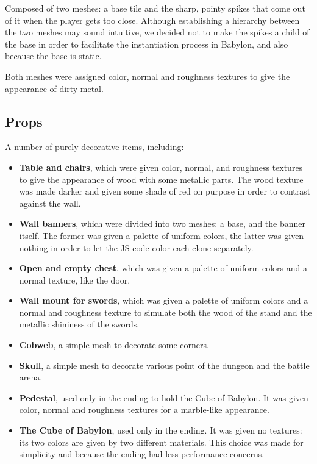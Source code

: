 Composed of two meshes: a base tile and the sharp, pointy spikes that come out of it when the player gets too close. Although establishing a hierarchy between the two meshes may sound intuitive, we decided not to make the spikes a child of the base in order to facilitate the instantiation process in Babylon, and also because the base is static.

Both meshes were assigned color, normal and roughness textures to give the appearance of dirty metal.

\subsection{Props}

A number of purely decorative items, including:

\begin{itemize}
    \item \textbf{Table and chairs}, which were given color, normal, and roughness textures to give the appearance of wood with some metallic parts. The wood texture was made darker and given some shade of red on purpose in order to contrast against the wall.
    \item \textbf{Wall banners}, which were divided into two meshes: a base, and the banner itself. The former was given a palette of uniform colors, the latter was given nothing in order to let the JS code color each clone separately.
    \item \textbf{Open and empty chest}, which was given a palette of uniform colors and a normal texture, like the door.
    \item \textbf{Wall mount for swords}, which was given a palette of uniform colors and a normal and roughness texture to simulate both the wood of the stand and the metallic shininess of the swords.
    \item \textbf{Cobweb}, a simple mesh to decorate some corners.
    \item \textbf{Skull}, a simple mesh to decorate various point of the dungeon and the battle arena.
    \item \textbf{Pedestal}, used only in the ending to hold the Cube of Babylon. It was given color, normal and roughness textures for a marble-like appearance.
    \item \textbf{The Cube of Babylon}, used only in the ending. It was given no textures: its two colors are given by two different materials. This choice was made for simplicity and because the ending had less performance concerns.
\end{itemize}